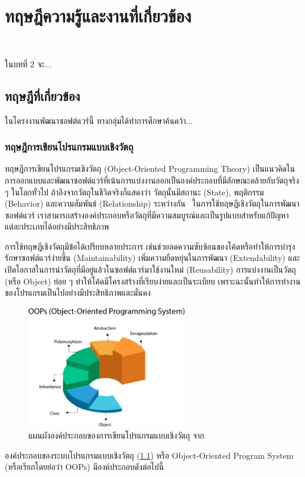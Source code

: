 \documentclass[12pt,one side,openright,a4paper]{cpe-thesis-th}
\newcommand{\thaijustify}[1]{%
  \par\hspace{30pt}\justifying
  #1
}
\begin{document}

\chapter{ทฤษฎีความรู้และงานที่เกี่ยวข้อง}
 \\
\thaijustify{
    ในบทที่ 2 จะ...
}
\section{ทฤษฎีที่เกี่ยวข้อง}
    \thaijustify{
        ในโครงงานพัฒนาซอฟต์แวร์นี้ ทางกลุ่มได้ทำการศึกษาค้นคว้า...
    }
    \subsection{ทฤษฎีการเขียนโปรแกรมแบบเชิงวัตถุ}
        \thaijustify{
            ทฤษฎีการเขียนโปรแกรมเชิงวัตถุ (Object-Oriented Programming Theory) เป็นแนวคิดในการออกแบบและพัฒนาซอฟต์แวร์ที่เน้นการแบ่งงานออกเป็นองค์ประกอบที่มีลักษณะคล้ายกับวัตถุจริง ๆ ในโลกทั่วไป ถ้าอิงจากวัตถุในชีวิตจริงก็แสดงว่า วัตถุนั้นมีสถานะ (State), พฤติกรรม (Behavior) และความสัมพันธ์ (Relationship) ระหว่างกัน~\cite{booch87} ในการใช้ทฤษฎีเชิงวัตถุในการพัฒนาซอฟต์แวร์ เราสามารถสร้างองค์ประกอบหรือวัตถุที่มีความสมบูรณ์และเป็นรูปแบบสำหรับแก้ปัญหาแต่ละประเภทได้อย่างมีประสิทธิภาพ~\cite{meyer2000}
        }
        \thaijustify{
            การใช้ทฤษฎีเชิงวัตถุมีข้อได้เปรียบหลายประการ เช่นช่วยลดความซับซ้อนของโค้ดหรือทำให้การบำรุงรักษาซอฟต์แวร์ง่ายขึ้น (Maintainability) เพิ่มความยืดหยุ่นในการพัฒนา (Extendability) และเปิดโอกาสในการนำวัตถุที่มีอยู่แล้วในซอฟต์แวร์มาใช้งานใหม่ (Reusability) การแบ่งงานเป็นวัตถุ (หรือ Object) ย่อย ๆ ทำให้โค้ดมีโครงสร้างที่เรียบง่ายและเป็นระเบียบ เพราะฉะนั้นทำให้การทำงานของโปรแกรมเป็นไปอย่างมีประสิทธิภาพและมั่นคง~\cite{meyer2000}
        }
        \begin{figure}[H]
            \centering
            \includegraphics[width=7cm]{figure/literature/oop-programming.png}
            \caption[แผนผังองค์ประกอบของ OOPs]{แผนผังองค์ประกอบของการเขียนโปรแกรมแบบเชิงวัตถุ จาก~\cite{apollo22oop}}
            \label{fig:oop-concept}
        \end{figure}
        \thaijustify{
            องค์ประกอบของระบบโปรแกรมแบบเชิงวัตถุ (\cref{fig:oop-concept}) หรือ Object-Oriented Program System (หรือเรียกโดยย่อว่า OOPs) มีองค์ประกอบดังต่อไปนี้ 
        }
\end{document}
